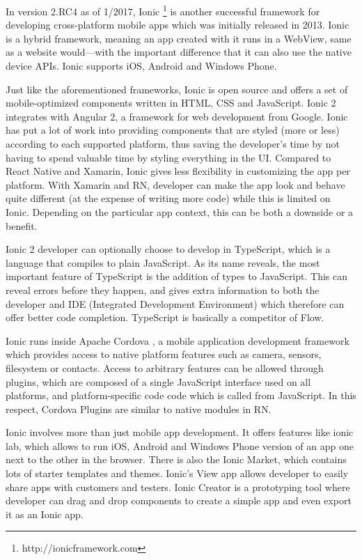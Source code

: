 In version 2.RC4 as of 1/2017, Ionic \footnote{http://ionicframework.com} is another successful framework for developing cross-platform mobile apps which was initially released in 2013. Ionic is a hybrid framework, meaning an app created with it runs in a WebView, same as a website would---with the important difference that it can also use the native device APIs. Ionic supports iOS, Android and Windows Phone.

Just like the aforementioned frameworks, Ionic is open source and offers a set of mobile-optimized components written in HTML, CSS and JavaScript. Ionic 2 integrates with Angular 2, a framework for web development from Google. Ionic has put a lot of work into providing components that are styled (more or less) according to each supported platform, thus saving the developer's time by not having to spend valuable time by styling everything in the UI. Compared to React Native and Xamarin, Ionic gives less flexibility in customizing the app per platform. With Xamarin and RN, developer can make the app look and behave quite different (at the expense of writing more code) while this is limited on Ionic. Depending on the particular app context, this can be both a downside or a benefit.

Ionic 2 developer can optionally choose to develop in TypeScript, which is a language that compiles to plain JavaScript. As its name reveals, the most important feature of TypeScript is the addition of types to JavaScript. This can reveal errors before they happen, and gives extra information to both the developer and IDE (Integrated Development Environment) which therefore can offer better code completion. TypeScript is basically a competitor of Flow.

Ionic runs inside Apache Cordova \cite{ionic:cordova}, a mobile application development framework which provides access to native platform features \cite{cordova:intro} such as camera, sensors, filesystem or contacts. Access to arbitrary features can be allowed through plugins, which are composed of a single JavaScript interface used on all platforms, and platform-specific code code which is called from JavaScript. In this respect, Cordova Plugins are similar to native modules in RN.

Ionic involves more than just mobile app development. It offers features like ionic lab, which allows to run iOS, Android and Windows Phone version of an app one next to the other in the browser. There is also the Ionic Market, which contains lots of starter templates and themes. Ionic's View app allows developer to easily share apps with customers and testers. Ionic Creator is a prototyping tool where developer can drag and drop components to create a simple app and even export it as an Ionic app.

